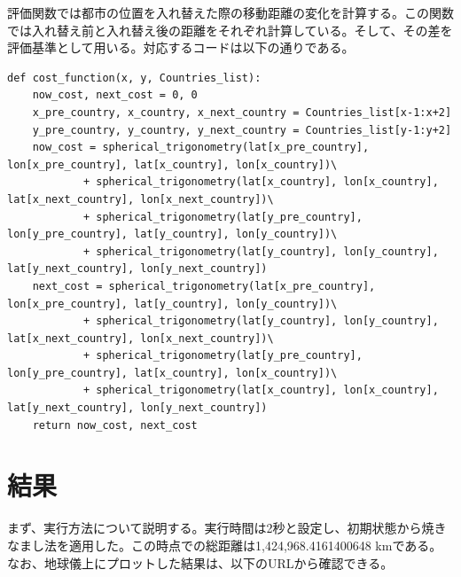 \documentclass[a4paper,11pt]{ltjsarticle}
\begin{document}
評価関数では都市の位置を入れ替えた際の移動距離の変化を計算する。この関数では入れ替え前と入れ替え後の距離をそれぞれ計算している。そして、その差を評価基準として用いる。対応するコードは以下の通りである。
\begin{lstlisting}
def cost_function(x, y, Countries_list):
    now_cost, next_cost = 0, 0
    x_pre_country, x_country, x_next_country = Countries_list[x-1:x+2]
    y_pre_country, y_country, y_next_country = Countries_list[y-1:y+2]
    now_cost = spherical_trigonometry(lat[x_pre_country], lon[x_pre_country], lat[x_country], lon[x_country])\
            + spherical_trigonometry(lat[x_country], lon[x_country], lat[x_next_country], lon[x_next_country])\
            + spherical_trigonometry(lat[y_pre_country], lon[y_pre_country], lat[y_country], lon[y_country])\
            + spherical_trigonometry(lat[y_country], lon[y_country], lat[y_next_country], lon[y_next_country])
    next_cost = spherical_trigonometry(lat[x_pre_country], lon[x_pre_country], lat[y_country], lon[y_country])\
            + spherical_trigonometry(lat[y_country], lon[y_country], lat[x_next_country], lon[x_next_country])\
            + spherical_trigonometry(lat[y_pre_country], lon[y_pre_country], lat[x_country], lon[x_country])\
            + spherical_trigonometry(lat[x_country], lon[x_country], lat[y_next_country], lon[y_next_country])
    return now_cost, next_cost
\end{lstlisting}

\section{結果}
まず、実行方法について説明する。実行時間は2秒と設定し、初期状態から焼きなまし法を適用した。この時点での総距離は1,424,968.4161400648 kmである。なお、地球儀上にプロットした結果は、以下のURLから確認できる。\\
\end{document}
